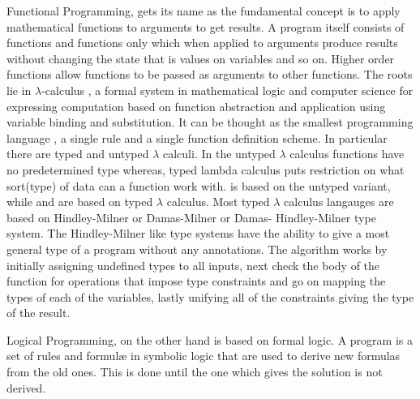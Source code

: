 \documentclass[thesis-solanki.tex]{subfiles}
\begin{document}
Functional Programming, \cite{hughes1989functional} gets its name as the fundamental concept is to apply
mathematical functions to arguments to get results.
A program itself consists of functions and functions only which when applied to arguments produce results without
changing the state that is values on variables and so on.
Higher order functions allow functions to be passed as arguments to other functions.
The roots lie in $\lambda$-calculus \cite{website:lambdacalculuswiki}, a formal system in mathematical logic and
computer science for expressing computation based on function abstraction and application using variable binding
and substitution.
It can be thought as the smallest programming language \cite{rojas2004tutorial}, a single rule and a single
function definition scheme.
In particular there are typed and untyped $\lambda$ calculi.
In the untyped $\lambda$ calculus functions have no predetermined type whereas{\large,} typed lambda calculus puts
restriction on what sort(type) of data can a function work with.
 is based on the untyped variant{\large,} while  and  are based on typed
$\lambda$ calculus.
Most typed $\lambda$ calculus langauges are based on Hindley-Milner or Damas-Milner or Damas- Hindley-Milner
\cite{website:hdmtypesystemwiki} type system.
The Hindley-Milner like type systems have the ability to give a most general type of a program without any annotations.
The algorithm \cite{website:hdmtypesystem} works by initially assigning undefined types to all inputs, next check
the body of the function for operations that impose type constraints and go on mapping the types of each of the
variables, lastly unifying all of the constraints giving the type of the result.

Logical Programming, \cite{spivey1995introduction} on the other hand is based on formal logic.
A program is a set of rules and formul\ae{} in symbolic logic that are used to derive new formulas from the old
ones.
This is done until the one which gives the solution is not derived.
\end{document}
